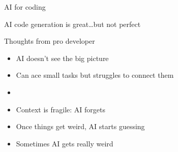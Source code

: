 \begin{frame}{AI for coding}
    
    \begin{figure}
       \centering
    \end{figure}

\end{frame}

\begin{frame}
    
    AI code generation is great\ldots but not perfect

\end{frame}


\begin{frame}

    Thoughts from pro developer 

    \begin{itemize}
        \item AI doesn't see the big picture
        \vspace{0.5em}
        \item Can ace small tasks but struggles to connect them 
        \vspace{0.5em}
        \item {}
        \vspace{0.5em}
        \item Context is fragile: AI forgets
        \vspace{0.5em}
        \item Once things get weird, AI starts guessing
        \vspace{0.5em}
        \item Sometimes AI gets really weird
    \end{itemize}

\end{frame}


